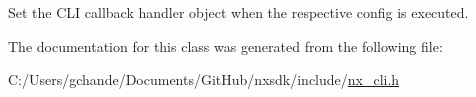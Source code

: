 Set the C\+LI callback handler object when the respective config is executed. 

The documentation for this class was generated from the following file\+:\begin{DoxyCompactItemize}
\item 
C\+:/\+Users/gchande/\+Documents/\+Git\+Hub/nxsdk/include/\mbox{\hyperlink{nx__cli_8h}{nx\+\_\+cli.\+h}}\end{DoxyCompactItemize}
